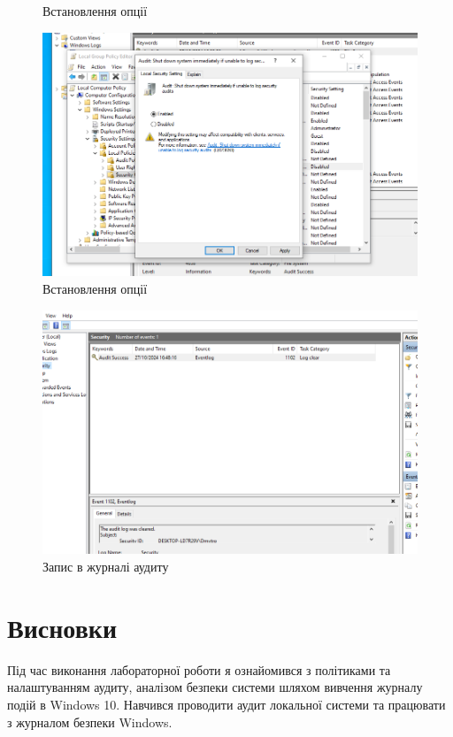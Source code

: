 \documentclass[oneside,14pt]{extarticle}
\begin{document}
\begin{normalsize}
\begin{figure}[H]
		\caption{Встановлення опції}
	\end{figure}
		\begin{figure}[H]
		\centering
		\includegraphics[width=\columnwidth]{5}
		\caption{Встановлення опції}
	\end{figure}
		\begin{figure}[H]
		\centering
		\includegraphics[width=\columnwidth]{6}
		\caption{Запис в журналі аудиту}
	\end{figure}
	\section*{Висновки}
	Під час виконання лабораторної роботи я ознайомився з політиками та налаштуванням аудиту,
	аналізом безпеки системи шляхом вивчення журналу подій в Windows 10.
	Навчився проводити аудит локальної системи та працювати з журналом
	безпеки Windows.
		    
\end{normalsize}
\end{document}
